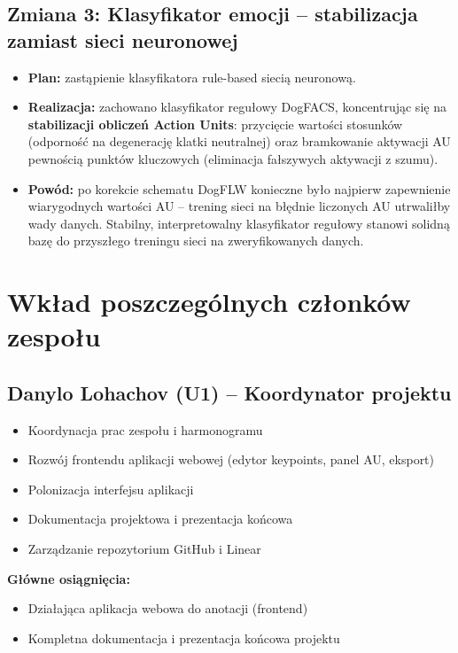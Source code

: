 \documentclass[11pt,a4paper]{article}
\begin{document}
\subsection{Zmiana 3: Klasyfikator emocji -- stabilizacja zamiast sieci neuronowej}
\begin{itemize}
  \item \textbf{Plan:} zastąpienie klasyfikatora rule-based siecią neuronową.
  \item \textbf{Realizacja:} zachowano klasyfikator regułowy DogFACS, koncentrując się
        na \textbf{stabilizacji obliczeń Action Units}: przycięcie wartości stosunków
        (odporność na degenerację klatki neutralnej) oraz bramkowanie aktywacji AU
        pewnością punktów kluczowych (eliminacja fałszywych aktywacji z szumu).
  \item \textbf{Powód:} po korekcie schematu DogFLW konieczne było najpierw zapewnienie
        wiarygodnych wartości AU -- trening sieci na błędnie liczonych AU utrwaliłby
        wady danych. Stabilny, interpretowalny klasyfikator regułowy stanowi solidną
        bazę do przyszłego treningu sieci na zweryfikowanych danych.
\end{itemize}

\section{Wkład poszczególnych członków zespołu}

\subsection{Danylo Lohachov (U1) -- Koordynator projektu}
\begin{itemize}
  \item Koordynacja prac zespołu i harmonogramu
  \item Rozwój frontendu aplikacji webowej (edytor keypoints, panel AU, eksport)
  \item Polonizacja interfejsu aplikacji
  \item Dokumentacja projektowa i prezentacja końcowa
  \item Zarządzanie repozytorium GitHub i Linear
\end{itemize}
\textbf{Główne osiągnięcia:}
\begin{itemize}
  \item Działająca aplikacja webowa do anotacji (frontend)
  \item Kompletna dokumentacja i prezentacja końcowa projektu
\end{itemize}
\end{document}
